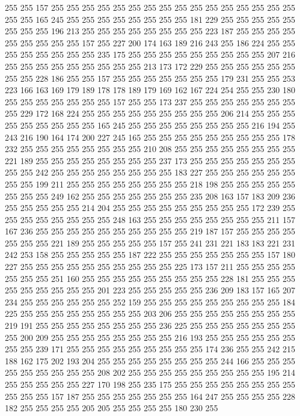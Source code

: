 255 255 157 255 255 255 255 255 255 255 255 255 255 255 255 255 255 255 255 255
255 165 245 255 255 255 255 255 255 255 255 181 229 255 255 255 255 255 255 255
255 196 213 255 255 255 255 255 255 255 255 223 187 255 255 255 255 255 255 255
255 255 157 255 227 200 174 163 189 216 243 255 186 224 255 255 255 255 255 255
255 255 235 175 255 255 255 255 255 255 255 255 255 207 216 255 255 255 255 255
255 255 255 255 213 173 172 229 255 255 255 255 255 255 255 255 228 186 255 255
157 255 255 255 255 255 255 255 179 231 255 255 253 223 166 163 169 179 189 178
178 189 179 169 162 167 224 254 255 255 230 180 255 255 255 255 255 255 255 157
255 255 173 237 255 255 255 255 255 255 255 255 229 172 168 224 255 255 255 255
255 255 255 255 255 206 214 255 255 255 255 255 255 255 255 255 165 245 255 255
255 255 255 255 255 255 216 194 255 243 216 190 164 174 200 227 245 165 255 255
255 255 255 255 255 255 255 178 232 255 255 255 255 255 255 255 255 210 208 255
255 255 255 255 255 255 255 221 189 255 255 255 255 255 255 255 255 237 173 255
255 255 255 255 255 255 255 255 242 255 255 255 255 255 255 255 255 183 227 255
255 255 255 255 255 255 255 199 211 255 255 255 255 255 255 255 255 218 198 255
255 255 255 255 255 255 255 249 162 255 255 255 255 255 255 255 235 208 163 157
183 209 236 255 255 255 255 255 214 204 255 255 255 255 255 255 255 255 255 172
239 255 255 255 255 255 255 255 255 248 163 255 255 255 255 255 255 255 255 211
157 167 236 255 255 255 255 255 255 255 255 255 255 219 187 157 255 255 255 255
255 255 255 221 189 255 255 255 255 255 157 255 241 231 221 183 183 221 231 242
253 158 255 255 255 255 255 187 222 255 255 255 255 255 255 255 157 180 227 255
255 255 255 255 255 255 255 255 255 225 173 157 211 255 255 255 255 255 255 255
251 160 255 255 255 255 255 255 255 255 255 228 181 255 255 255 255 255 255 255
255 255 201 223 255 255 255 255 255 236 209 183 157 165 207 234 255 255 255 255
255 255 252 159 255 255 255 255 255 255 255 255 255 184 225 255 255 255 255 255
255 255 255 203 206 255 255 255 255 255 255 255 255 219 191 255 255 255 255 255
255 255 255 236 225 255 255 255 255 255 255 255 255 200 209 255 255 255 255 255
255 255 255 216 193 255 255 255 255 255 255 255 255 239 171 255 255 255 255 255
255 255 255 255 174 236 255 255 242 215 188 162 175 202 193 204 255 255 255 255
255 255 255 255 244 166 255 255 255 255 255 255 255 255 255 208 202 255 255 255
255 255 255 255 255 255 195 214 255 255 255 255 255 227 170 198 255 235 175 255
255 255 255 255 255 255 255 255 255 255 157 187 255 255 255 255 255 255 255 164
247 255 255 255 255 228 182 255 255 255 255 205 205 255 255 255 255 180 230 255
